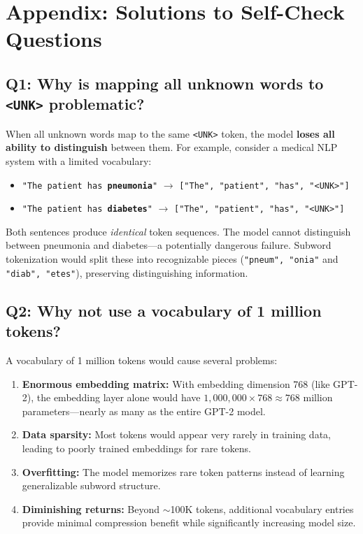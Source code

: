 \documentclass[11pt,a4paper]{article}
\begin{document}
\newpage
\section*{Appendix: Solutions to Self-Check Questions}

\subsection*{Q1: Why is mapping all unknown words to \texttt{<UNK>} problematic?}

When all unknown words map to the same \texttt{<UNK>} token, the model \textbf{loses all ability to distinguish} between them. For example, consider a medical NLP system with a limited vocabulary:

\begin{itemize}[leftmargin=1.5em]
    \item \texttt{"The patient has \textbf{pneumonia}"} $\to$ \texttt{["The", "patient", "has", "<UNK>"]}
    \item \texttt{"The patient has \textbf{diabetes}"} $\to$ \texttt{["The", "patient", "has", "<UNK>"]}
\end{itemize}

Both sentences produce \emph{identical} token sequences. The model cannot distinguish between pneumonia and diabetes---a potentially dangerous failure. Subword tokenization would split these into recognizable pieces (\texttt{"pneum", "onia"} and \texttt{"diab", "etes"}), preserving distinguishing information.

\subsection*{Q2: Why not use a vocabulary of 1 million tokens?}

A vocabulary of 1 million tokens would cause several problems:

\begin{enumerate}[leftmargin=1.5em]
    \item \textbf{Enormous embedding matrix:} With embedding dimension 768 (like GPT-2), the embedding layer alone would have $1{,}000{,}000 \times 768 \approx 768$ million parameters---nearly as many as the entire GPT-2 model.
    \item \textbf{Data sparsity:} Most tokens would appear very rarely in training data, leading to poorly trained embeddings for rare tokens.
    \item \textbf{Overfitting:} The model memorizes rare token patterns instead of learning generalizable subword structure.
    \item \textbf{Diminishing returns:} Beyond $\sim$100K tokens, additional vocabulary entries provide minimal compression benefit while significantly increasing model size.
\end{enumerate}
\end{document}
